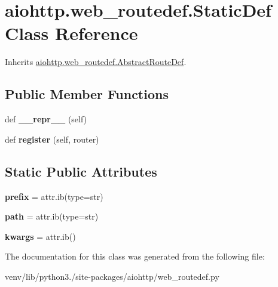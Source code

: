 \hypertarget{classaiohttp_1_1web__routedef_1_1_static_def}{}\section{aiohttp.\+web\+\_\+routedef.\+Static\+Def Class Reference}
\label{classaiohttp_1_1web__routedef_1_1_static_def}


Inherits \hyperlink{classaiohttp_1_1web__routedef_1_1_abstract_route_def}{aiohttp.\+web\+\_\+routedef.\+Abstract\+Route\+Def}.

\subsection*{Public Member Functions}
\begin{DoxyCompactItemize}
\item 
\mbox{\label{classaiohttp_1_1web__routedef_1_1_static_def_a3dd130643ab436ad756db61d535e089e}} 
def {\bfseries \+\_\+\+\_\+repr\+\_\+\+\_\+} (self)
\item 
\mbox{\label{classaiohttp_1_1web__routedef_1_1_static_def_a51fa267106510381c29de8b3b615854b}} 
def {\bfseries register} (self, router)
\end{DoxyCompactItemize}
\subsection*{Static Public Attributes}
\begin{DoxyCompactItemize}
\item 
\mbox{\label{classaiohttp_1_1web__routedef_1_1_static_def_add1f63bdf2d09046a68b6d2d02d5e02f}} 
{\bfseries prefix} = attr.\+ib(type=str)
\item 
\mbox{\label{classaiohttp_1_1web__routedef_1_1_static_def_a9ecbf83a7166c1d45bb5cbb56f67e5de}} 
{\bfseries path} = attr.\+ib(type=str)
\item 
\mbox{\label{classaiohttp_1_1web__routedef_1_1_static_def_a49cf4c191f4b2cce73bf15840b016889}} 
{\bfseries kwargs} = attr.\+ib()
\end{DoxyCompactItemize}


The documentation for this class was generated from the following file\+:\begin{DoxyCompactItemize}
\item 
venv/lib/python3./site-\/packages/aiohttp/web\+\_\+routedef.\+py\end{DoxyCompactItemize}
